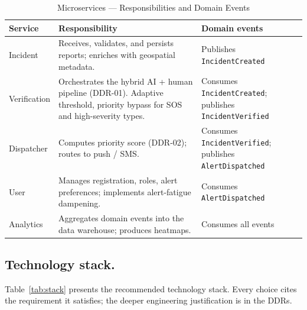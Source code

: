 \documentclass[12pt,a4paper]{article}
\begin{document}
\begin{table}[h]
\caption{Microservices --- Responsibilities and Domain Events}
\label{tab:services}
\centering
\begin{tabularx}{\textwidth}{lXl}
\toprule
\textbf{Service} & \textbf{Responsibility} & \textbf{Domain events} \\
\midrule
Incident & Receives, validates, and persists reports; enriches with geospatial metadata. & Publishes \texttt{IncidentCreated} \\
Verification & Orchestrates the hybrid AI + human pipeline (DDR-01). Adaptive threshold, priority bypass for SOS and high-severity types. & Consumes \texttt{IncidentCreated}; publishes \texttt{IncidentVerified} \\
Dispatcher & Computes priority score (DDR-02); routes to push / SMS. & Consumes \texttt{IncidentVerified}; publishes \texttt{AlertDispatched} \\
User & Manages registration, roles, alert preferences; implements alert-fatigue dampening. & Consumes \texttt{AlertDispatched} \\
Analytics & Aggregates domain events into the data warehouse; produces heatmaps. & Consumes all events \\
\bottomrule
\end{tabularx}
\end{table}

\subsection{Technology stack.}
Table~\ref{tab:stack} presents the recommended technology stack.
Every choice cites the requirement it satisfies; the deeper
engineering justification is in the DDRs.
\end{document}
